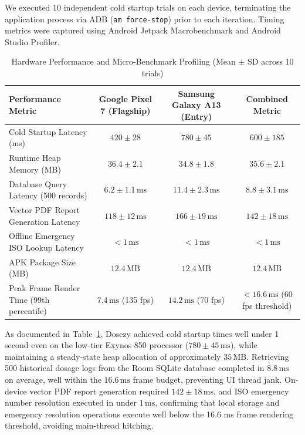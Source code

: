 \documentclass[11pt,a4paper]{article}
\begin{document}
We executed 10 independent cold startup trials on each device, terminating the application process via ADB (\texttt{am force-stop}) prior to each iteration. Timing metrics were captured using Android Jetpack Macrobenchmark and Android Studio Profiler.

\begin{table}[htbp]
\centering
\small
\caption{Hardware Performance and Micro-Benchmark Profiling (Mean $\pm$ SD across 10 trials)}
\label{tab:runtime_profiling}
\begin{tabular}{lccc}
\toprule
\textbf{Performance Metric} & \textbf{Google Pixel 7 (Flagship)} & \textbf{Samsung Galaxy A13 (Entry)} & \textbf{Combined Metric} \\
\midrule
Cold Startup Latency (ms) & $420 \pm 28$ & $780 \pm 45$ & $600 \pm 185$ \\
Runtime Heap Memory (MB) & $36.4 \pm 2.1$ & $34.8 \pm 1.8$ & $35.6 \pm 2.1$ \\
Database Query Latency (500 records) & $6.2 \pm 1.1\,\text{ms}$ & $11.4 \pm 2.3\,\text{ms}$ & $8.8 \pm 3.1\,\text{ms}$ \\
Vector PDF Report Generation Latency & $118 \pm 12\,\text{ms}$ & $166 \pm 19\,\text{ms}$ & $142 \pm 18\,\text{ms}$ \\
Offline Emergency ISO Lookup Latency & $< 1\,\text{ms}$ & $< 1\,\text{ms}$ & $< 1\,\text{ms}$ \\
APK Package Size (MB) & $12.4\,\text{MB}$ & $12.4\,\text{MB}$ & $12.4\,\text{MB}$ \\
Peak Frame Render Time (99th percentile) & $7.4\,\text{ms}$ (135 fps) & $14.2\,\text{ms}$ (70 fps) & $< 16.6\,\text{ms}$ (60 fps threshold) \\
\bottomrule
\end{tabular}
\end{table}

As documented in Table~\ref{tab:runtime_profiling}, Dosezy achieved cold startup times well under 1 second even on the low-tier Exynos 850 processor ($780 \pm 45\,\text{ms}$), while maintaining a steady-state heap allocation of approximately $35\,\text{MB}$. Retrieving 500 historical dosage logs from the Room SQLite database completed in $8.8\,\text{ms}$ on average, well within the $16.6\,\text{ms}$ frame budget, preventing UI thread jank. On-device vector PDF report generation required $142 \pm 18\,\text{ms}$, and ISO emergency number resolution executed in under $1\,\text{ms}$, confirming that local storage and emergency resolution operations execute well below the 16.6 ms frame rendering threshold, avoiding main-thread hitching.
\end{document}
